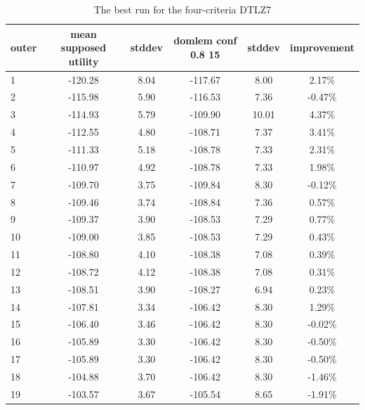 \begin{table}[htb]
  \centering
  \begin{tabular}{l c c c c c}
    \hline
outer & mean supposed utility & stddev & domlem conf 0.8 15 & stddev & improvement \\
    \hline
    \hline
1 & -120.28 & 8.04 & -117.67 & 8.00 & 2.17\% \\
2 & -115.98 & 5.90 & -116.53 & 7.36 & -0.47\% \\
3 & -114.93 & 5.79 & -109.90 & 10.01 & 4.37\% \\
4 & -112.55 & 4.80 & -108.71 & 7.37 & 3.41\% \\
5 & -111.33 & 5.18 & -108.78 & 7.33 & 2.31\% \\
6 & -110.97 & 4.92 & -108.78 & 7.33 & 1.98\% \\
7 & -109.70 & 3.75 & -109.84 & 8.30 & -0.12\% \\
8 & -109.46 & 3.74 & -108.84 & 7.36 & 0.57\% \\
9 & -109.37 & 3.90 & -108.53 & 7.29 & 0.77\% \\
10 & -109.00 & 3.85 & -108.53 & 7.29 & 0.43\% \\
11 & -108.80 & 4.10 & -108.38 & 7.08 & 0.39\% \\
12 & -108.72 & 4.12 & -108.38 & 7.08 & 0.31\% \\
13 & -108.51 & 3.90 & -108.27 & 6.94 & 0.23\% \\
14 & -107.81 & 3.34 & -106.42 & 8.30 & 1.29\% \\
15 & -106.40 & 3.46 & -106.42 & 8.30 & -0.02\% \\
16 & -105.89 & 3.30 & -106.42 & 8.30 & -0.50\% \\
17 & -105.89 & 3.30 & -106.42 & 8.30 & -0.50\% \\
18 & -104.88 & 3.70 & -106.42 & 8.30 & -1.46\% \\
19 & -103.57 & 3.67 & -105.54 & 8.65 & -1.91\% \\
    \hline
  \end{tabular}
  \caption{The best run for the four-criteria DTLZ7}
  \label{t:un_best_4}
\end{table}


